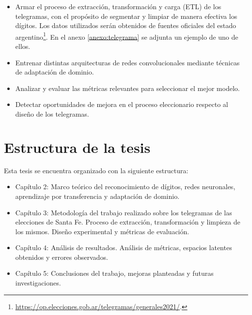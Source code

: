 \begin{itemize}
    \item Armar el proceso de extracción, transformación y carga (ETL) de los telegramas, con el propósito de segmentar y limpiar
          de manera efectiva los dígitos. Los datos utilizados serán obtenidos de fuentes oficiales del estado
          argentino\footnote{\href{https://op.elecciones.gob.ar/telegramas/generales2021/}{https://op.elecciones.gob.ar/telegramas/generales2021/}.}.
          En el anexo \ref{anexo:telegrama} se adjunta un ejemplo de uno de ellos.
    \item Entrenar distintas arquitecturas de redes convolucionales mediante técnicas de adaptación de dominio.
    \item Analizar y evaluar las métricas relevantes para seleccionar el mejor modelo.
    \item Detectar oportunidades de mejora en el proceso eleccionario respecto al diseño de los telegramas.
\end{itemize}

\section{Estructura de la tesis}

Esta tesis se encuentra organizado con la siguiente estructura:

\begin{itemize}
    \item Capítulo 2: Marco teórico del reconocimiento de dígitos, redes neuronales, aprendizaje por transferencia y adaptación
          de dominio.
    \item Capítulo 3: Metodología del trabajo realizado sobre los telegramas de las elecciones de Santa Fe. Proceso de
          extracción, transformación y limpieza de los mismos. Diseño experimental y métricas de evaluación.
    \item Capítulo 4: Análisis de resultados. Análisis de métricas, espacios latentes obtenidos y errores observados.
    \item Capítulo 5: Conclusiones del trabajo, mejoras planteadas y futuras investigaciones.
\end{itemize}